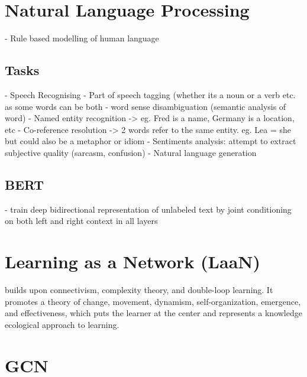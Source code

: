 \documentclass{report}
\begin{document}
\chapter{Natural Language Processing}
- Rule based modelling of human language
\section{Tasks}
- Speech Recognising
- Part of speech tagging (whether its a noun or a verb etc. as some words can be both
- word sense disambiguation (semantic analysis of word)
- Named entity recognition -> eg. Fred is a name, Germany is a location, etc
- Co-reference resolution -> 2 words refer to the same entity. eg. Lea = she but could also be a metaphor or idiom
- Sentiments analysis: attempt to extract subjective quality (sarcasm, confusion)
- Natural language generation

\section{BERT}
- train deep bidirectional representation of unlabeled text by joint conditioning on both left and right context in all layers

\chapter{Learning as a Network (LaaN)}
builds upon connectivism, complexity theory, and double-loop learning. It promotes a theory of change, movement, dynamism, self-organization, emergence, and effectiveness, which puts the learner at the center and represents a knowledge ecological approach to learning. 


\chapter{GCN}
\end{document}

